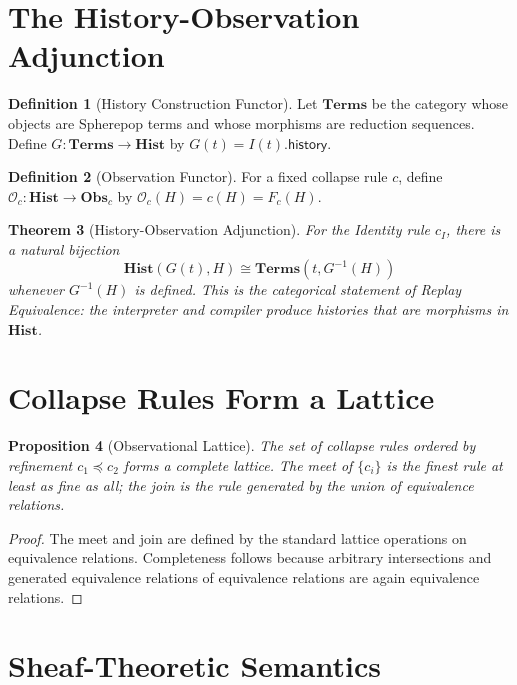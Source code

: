 \documentclass[12pt, a4paper, openany]{book}
\theoremstyle{plain}
\newtheorem{theorem}{Theorem}[chapter]
\newtheorem{proposition}[theorem]{Proposition}
\theoremstyle{definition}
\newtheorem{definition}[theorem]{Definition}
\theoremstyle{remark}
\newcommand{\Hist}{\mathbf{Hist}}
\newcommand{\Obs}{\mathbf{Obs}}
\begin{document}
\section{The History-Observation Adjunction}

\begin{definition}[History Construction Functor]
Let $\mathbf{Terms}$ be the category whose objects are Spherepop terms and whose
morphisms are reduction sequences. Define $G : \mathbf{Terms} \to \Hist$ by
$G(t) = I(t).\mathsf{history}$.
\end{definition}

\begin{definition}[Observation Functor]
For a fixed collapse rule $c$, define $\mathcal{O}_c : \Hist \to \Obs_c$ by
$\mathcal{O}_c(H) = c(H) = F_c(H)$.
\end{definition}

\begin{theorem}[History-Observation Adjunction]
For the Identity rule $c_I$, there is a natural bijection
\[
\Hist(G(t), H) \cong \mathbf{Terms}(t, G^{-1}(H))
\]
whenever $G^{-1}(H)$ is defined. This is the categorical statement of Replay
Equivalence: the interpreter and compiler produce histories that are morphisms in
$\Hist$.
\end{theorem}

\section{Collapse Rules Form a Lattice}

\begin{proposition}[Observational Lattice]
The set of collapse rules ordered by refinement $c_1 \preceq c_2$ forms a complete
lattice. The meet of $\{c_i\}$ is the finest rule at least as fine as all; the
join is the rule generated by the union of equivalence relations.
\end{proposition}

\begin{proof}
The meet and join are defined by the standard lattice operations on equivalence
relations. Completeness follows because arbitrary intersections and generated
equivalence relations of equivalence relations are again equivalence relations.
\end{proof}

\section{Sheaf-Theoretic Semantics}
\end{document}
